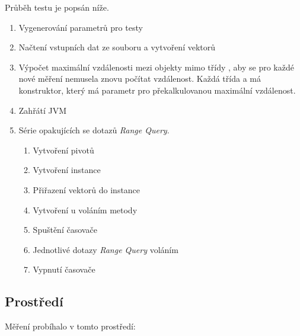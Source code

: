 Průběh testu je popsán níže.

\begin{enumerate}
\item Vygenerování parametrů pro testy
\item Načtení vstupních dat ze souboru a vytvoření vektorů
\item Výpočet maximální vzdálenosti mezi objekty mimo třídy , aby se pro každé nové měření nemusela znovu počítat vzdálenost.
Každá třída  a  má konstruktor, který má parametr pro překalkulovanou maximální vzdálenost.
\item Zahřátí JVM
\item Série opakujících se dotazů \emph{Range Query}.
\begin{enumerate}
\item Vytvoření pivotů
\item Vytvoření instance \type{\MIndex}
\item Přiřazení vektorů do instance \type{\MIndex}
\item Vytvoření \MIndex u voláním metody 
\item Spuštění časovače
\item Jednotlivé dotazy \emph{Range Query} voláním 
\item Vypnutí časovače
\end{enumerate}

\end{enumerate}
\subsection{Prostředí}
Měření probíhalo v tomto prostředí:

